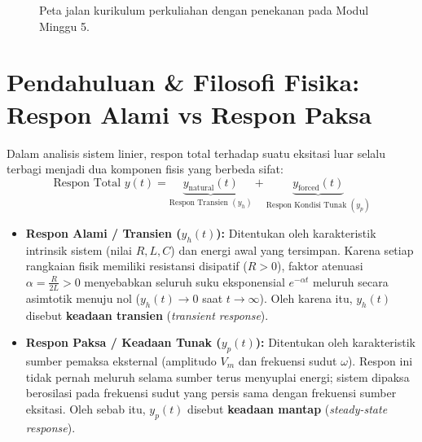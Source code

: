 \documentclass[11pt,a4paper]{article}
\theoremstyle{definition}
\begin{document}
\begin{figure}[htbp]
{%
}
\caption{Peta jalan kurikulum perkuliahan dengan penekanan pada Modul Minggu 5.}
\label{fig:peta_jalan_pd_w5}
\end{figure}

\section{Pendahuluan \& Filosofi Fisika: Respon Alami vs Respon Paksa}

Dalam analisis sistem linier, respon total terhadap suatu eksitasi luar selalu terbagi menjadi dua komponen fisis yang berbeda sifat:
\begin{equation}
    \text{Respon Total } y(t) = \underbrace{y_{\text{natural}}(t)}_{\text{Respon Transien } (y_h)} + \underbrace{y_{\text{forced}}(t)}_{\text{Respon Kondisi Tunak } (y_p)}
    \label{eq:physical_response_split}
\end{equation}
\begin{itemize}[leftmargin=*]
    \item \textbf{Respon Alami / Transien ($y_h(t)$):} Ditentukan oleh karakteristik intrinsik sistem (nilai $R, L, C$) dan energi awal yang tersimpan. Karena setiap rangkaian fisik memiliki resistansi disipatif ($R > 0$), faktor atenuasi $\alpha = \frac{R}{2L} > 0$ menyebabkan seluruh suku eksponensial $e^{-\alpha t}$ meluruh secara asimtotik menuju nol ($y_h(t) \to 0$ saat $t \to \infty$). Oleh karena itu, $y_h(t)$ disebut \textbf{keadaan transien} (\textit{transient response}).
    \item \textbf{Respon Paksa / Keadaan Tunak ($y_p(t)$):} Ditentukan oleh karakteristik sumber pemaksa eksternal (amplitudo $V_m$ dan frekuensi sudut $\omega$). Respon ini tidak pernah meluruh selama sumber terus menyuplai energi; sistem dipaksa berosilasi pada frekuensi sudut yang persis sama dengan frekuensi sumber eksitasi. Oleh sebab itu, $y_p(t)$ disebut \textbf{keadaan mantap} (\textit{steady-state response}).
\end{itemize}
\end{document}

